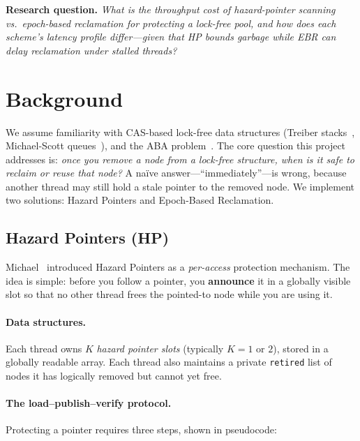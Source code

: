 \documentclass[11pt,a4paper]{article}
\begin{document}
\medskip
\noindent\textbf{Research question.}
\emph{What is the throughput cost of hazard-pointer scanning vs.\
epoch-based reclamation for protecting a lock-free pool, and how does each
scheme's latency profile differ---given that HP bounds garbage while EBR
can delay reclamation under stalled threads?}

\section{Background}
\label{sec:background}

We assume familiarity with CAS-based lock-free data structures (Treiber
stacks~\cite{treiber1986systems}, Michael-Scott
queues~\cite{michael1996simple}), and the ABA
problem~\cite[Ch.~10, \S10.6]{AoMPP}.  The core question this project
addresses is: \emph{once you remove a node from a lock-free structure, when is
it safe to reclaim or reuse that node?}  A na\"ive answer---``immediately''---is
wrong, because another thread may still hold a stale pointer to the removed
node.  We implement two solutions: Hazard Pointers and Epoch-Based Reclamation.

\subsection{Hazard Pointers (HP)}

Michael~\cite{michael2004hazard} introduced Hazard Pointers as a
\emph{per-access} protection mechanism.  The idea is simple: before you follow
a pointer, you \textbf{announce} it in a globally visible slot so that no other
thread frees the pointed-to node while you are using it.

\paragraph{Data structures.}
Each thread owns $K$ \emph{hazard pointer slots} (typically $K = 1$ or $2$),
stored in a globally readable array.  Each thread also maintains a private
\texttt{retired} list of nodes it has logically removed but cannot yet free.

\paragraph{The load--publish--verify protocol.}
Protecting a pointer requires three steps, shown in pseudocode:
\end{document}
